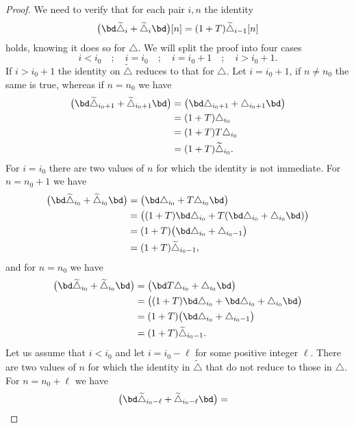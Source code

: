 \begin{proof}
	We need to verify that for each pair $i,n$ the identity
	\[
	\big(\bd \widetilde\triangle_{i} + \widetilde\triangle_{i}\bd\big)[n] =
	(1+T) \widetilde\triangle_{i-1}[n]
	\]
	holds, knowing it does so for $\triangle$.
	We will split the proof into four cases
	\[
	i < i_0 \quad;\quad i = i_0 \quad;\quad i = i_0+1 \quad;\quad i > i_0+1.
	\]
	If $i > i_0+1$ the identity on $\widetilde\triangle$ reduces to that for $\triangle$.
	Let $i = i_0+1$, if $n \neq n_0$ the same is true, whereas if $n = n_0$ we have
	\begin{align*}
		\big(\bd \widetilde\triangle_{i_0+1} + \widetilde\triangle_{i_0+1} \bd\big) &=
		\big(\bd \triangle_{i_0+1} + \triangle_{i_0+1} \bd\big) \\ &=
		(1+T)\triangle_{i_0} \\ &=
		(1+T)T\triangle_{i_0} \\ &=
		(1+T)\widetilde\triangle_{i_0}.
	\end{align*}
	For $i = i_0$ there are two values of $n$ for which the identity is not immediate.
	For $n = n_0+1$ we have
	\begin{align*}
		\big(\bd \widetilde\triangle_{i_0} + \widetilde\triangle_{i_0} \bd\big) &=
		\big(\bd \triangle_{i_0} + T\triangle_{i_0} \bd\big) \\ &=
		\big((1+T)\bd\triangle_{i_0} + T(\bd\triangle_{i_0} + \triangle_{i_0}\bd)\big) \\ &=
		(1+T)\big(\bd\triangle_{i_0} + \triangle_{i_0-1}\big) \\ &=
		(1+T)\widetilde\triangle_{i_0-1},
	\end{align*}
	and for $n = n_0$ we have
	\begin{align*}
		\big(\bd \widetilde\triangle_{i_0} + \widetilde\triangle_{i_0} \bd\big) &=
		\big(\bd T \triangle_{i_0} + \triangle_{i_0} \bd\big) \\ &=
		\big((1+T)\bd\triangle_{i_0} + \bd\triangle_{i_0} + \triangle_{i_0}\bd\big) \\ &=
		(1+T)\big(\bd\triangle_{i_0} + \triangle_{i_0-1}\big) \\ &=
		(1+T)\widetilde\triangle_{i_0-1}.
	\end{align*}
	Let us assume that $i < i_0$ and let $i = i_0 - \ell$ for some positive integer $\ell$.
	There are two values of $n$ for which the identity in $\widetilde\triangle$ that do not reduce to those in $\triangle$.
	For $n = n_0+\ell$ we have
	\begin{align*}
		\big(\bd\widetilde\triangle_{i_0-\ell} + \widetilde\triangle_{i_0-\ell} \bd\big) &=

\end{align*}
\end{proof}
